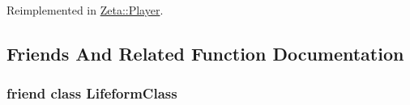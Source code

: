 Reimplemented in \hyperlink{classZeta_1_1Player_ab8a83fff1013ce770f28e6510b1e55f6}{Zeta\+::\+Player}.



\subsection{Friends And Related Function Documentation}
\hypertarget{classZeta_1_1Lifeform_a7ffb604937129303b18f86529c2e146f}{
\subsubsection[{Lifeform\+Class}]{\setlength{\rightskip}{0pt plus 5cm}friend class {\bf Lifeform\+Class}\hspace{0.3cm}{\ttfamily [friend]}}}\label{classZeta_1_1Lifeform_a7ffb604937129303b18f86529c2e146f}


